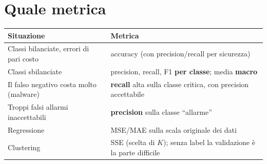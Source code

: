 \section{Quale metrica}
\begin{center}
\small
\begin{tabularx}{\textwidth}{l X}
\toprule
\textbf{Situazione} & \textbf{Metrica}\\
\midrule
Classi bilanciate, errori di pari costo & accuracy (con precision/recall per sicurezza)\\
Classi sbilanciate & precision, recall, F1 \textbf{per classe}; media \textbf{macro}\\
Il falso negativo costa molto (malware) & \textbf{recall} alta sulla classe critica, con precision accettabile\\
Troppi falsi allarmi inaccettabili & \textbf{precision} sulla classe ``allarme''\\
Regressione & MSE/MAE sulla scala originale dei dati\\
Clustering & SSE (scelta di $K$); senza label la validazione è la parte difficile\\
\bottomrule
\end{tabularx}
\end{center}

